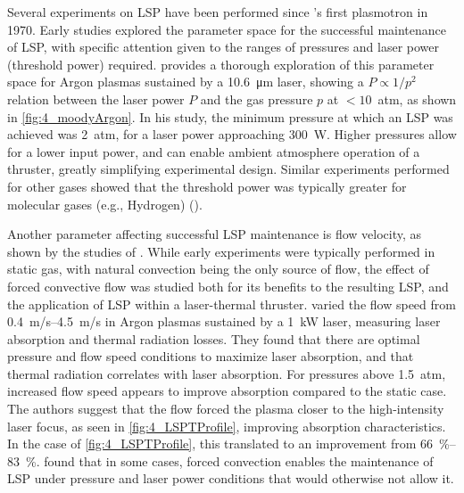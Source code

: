         Several experiments on LSP have been performed since \citeauthor{generalovContinuousOpticalDischarge1970}'s first plasmotron in 1970. Early studies explored the parameter space for the successful maintenance of LSP, with specific attention given to the ranges of pressures and laser power (threshold power) required. \textcite{moodyMaintenanceGasBreakdown1975} provides a thorough exploration of this parameter space for Argon plasmas sustained by a \qty{10.6}{\um} laser, showing a $P \propto 1/p^2$ relation between the laser power $P$ and the gas pressure $p$ at $<10$~atm, as shown in \autoref{fig:4_moodyArgon}. In his study, the minimum pressure at which an LSP was achieved was 2~atm, for a laser power approaching 300~W. Higher pressures allow for a lower input power, and can enable ambient atmosphere operation of a thruster, greatly simplifying experimental design. Similar experiments performed for other gases showed that the threshold power was typically greater for molecular gases (e.g., Hydrogen) (\textcite{keeferLaserSustainedPlasmas1989}).

        Another parameter affecting successful LSP maintenance is flow velocity, as shown by the studies of \textcite{welleEnergyConversionEfficiency1986,krierContinuousWaveLaser1986,gerasimenkoLaserPlasmatron1983}. While early experiments were typically performed in static gas, with natural convection being the only source of flow, the effect of forced convective flow was studied both for its benefits to the resulting LSP, and the application of LSP within a laser-thermal thruster. \citeauthor{welleEnergyConversionEfficiency1986} varied the flow speed from \qtyrange{0.4}{4.5}{m/s} in Argon plasmas sustained by a 1~kW laser, measuring laser absorption and thermal radiation losses. They found that there are optimal pressure and flow speed conditions to maximize laser absorption, and that thermal radiation correlates with laser absorption. For pressures above 1.5~atm, increased flow speed appears to improve absorption compared to the static case. The authors suggest that the flow forced the plasma closer to the high-intensity laser focus, as seen in \autoref{fig:4_LSPTProfile}, improving absorption characteristics. In the case of \autoref{fig:4_LSPTProfile}, this translated to an improvement from \qtyrange{66}{83}{\percent}. \citeauthor{gerasimenkoLaserPlasmatron1983} found that in some cases, forced convection enables the maintenance of LSP under pressure and laser power conditions that would otherwise not allow it.

